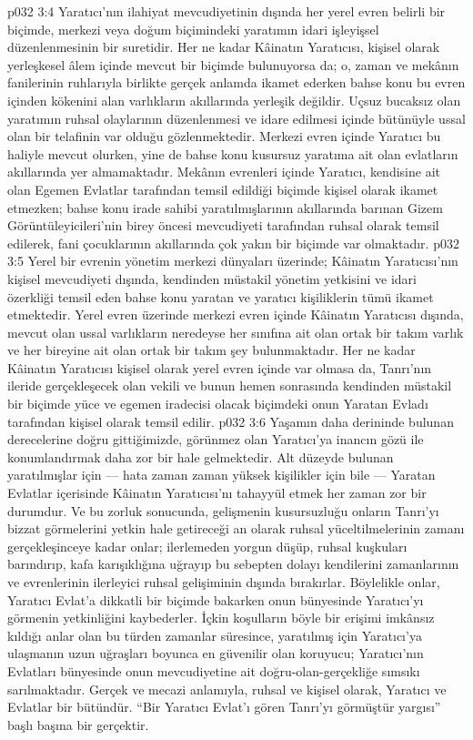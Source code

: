 \vs p032 3:4 Yaratıcı’nın ilahiyat mevcudiyetinin dışında her yerel evren belirli bir biçimde, merkezi veya doğum biçimindeki yaratımın idari işleyişsel düzenlenmesinin bir suretidir. Her ne kadar Kâinatın Yaratıcısı, kişisel olarak yerleşkesel âlem içinde mevcut bir biçimde bulunuyorsa da; o, zaman ve mekânın fanilerinin ruhlarıyla birlikte gerçek anlamda ikamet ederken bahse konu bu evren içinden kökenini alan varlıkların akıllarında yerleşik değildir. Uçsuz bucaksız olan yaratımın ruhsal olaylarının düzenlenmesi ve idare edilmesi içinde bütünüyle ussal olan bir telafinin var olduğu gözlenmektedir. Merkezi evren içinde Yaratıcı bu haliyle mevcut olurken, yine de bahse konu kusursuz yaratıma ait olan evlatların akıllarında yer almamaktadır. Mekânın evrenleri içinde Yaratıcı, kendisine ait olan Egemen Evlatlar tarafından temsil edildiği biçimde kişisel olarak ikamet etmezken; bahse konu irade sahibi yaratılmışlarının akıllarında barınan Gizem Görüntüleyicileri’nin birey öncesi mevcudiyeti tarafından ruhsal olarak temsil edilerek, fani çocuklarının akıllarında çok yakın bir biçimde var olmaktadır.
\vs p032 3:5 Yerel bir evrenin yönetim merkezi dünyaları üzerinde; Kâinatın Yaratıcısı’nın kişisel mevcudiyeti dışında, kendinden müstakil yönetim yetkisini ve idari özerkliği temsil eden bahse konu yaratan ve yaratıcı kişiliklerin tümü ikamet etmektedir. Yerel evren üzerinde merkezi evren içinde Kâinatın Yaratıcısı dışında, mevcut olan ussal varlıkların neredeyse her sınıfına ait olan ortak bir takım varlık ve her bireyine ait olan ortak bir takım şey bulunmaktadır. Her ne kadar Kâinatın Yaratıcısı kişisel olarak yerel evren içinde var olmasa da, Tanrı’nın ileride gerçekleşecek olan vekili ve bunun hemen sonrasında kendinden müstakil bir biçimde yüce ve egemen iradecisi olacak biçimdeki onun Yaratan Evladı tarafından kişisel olarak temsil edilir.
\vs p032 3:6 Yaşamın daha derininde bulunan derecelerine doğru gittiğimizde, görünmez olan Yaratıcı’ya inancın gözü ile konumlandırmak daha zor bir hale gelmektedir. Alt düzeyde bulunan yaratılmışlar için --- hata zaman zaman yüksek kişilikler için bile --- Yaratan Evlatlar içerisinde Kâinatın Yaratıcısı’nı tahayyül etmek her zaman zor bir durumdur. Ve bu zorluk sonucunda, gelişmenin kusursuzluğu onların Tanrı’yı bizzat görmelerini yetkin hale getireceği an olarak ruhsal yüceltilmelerinin zamanı gerçekleşinceye kadar onlar; ilerlemeden yorgun düşüp, ruhsal kuşkuları barındırıp, kafa karışıklığına uğrayıp bu sebepten dolayı kendilerini zamanlarının ve evrenlerinin ilerleyici ruhsal gelişiminin dışında bırakırlar. Böylelikle onlar, Yaratıcı Evlat’a dikkatli bir biçimde bakarken onun bünyesinde Yaratıcı’yı görmenin yetkinliğini kaybederler. İçkin koşulların böyle bir erişimi imkânsız kıldığı anlar olan bu türden zamanlar süresince, yaratılmış için Yaratıcı’ya ulaşmanın uzun uğraşları boyunca en güvenilir olan koruyucu; Yaratıcı’nın Evlatları bünyesinde onun mevcudiyetine ait doğru\hyp{}olan\hyp{}gerçekliğe sımsıkı sarılmaktadır. Gerçek ve mecazi anlamıyla, ruhsal ve kişisel olarak, Yaratıcı ve Evlatlar bir bütündür. “Bir Yaratıcı Evlat’ı gören Tanrı’yı görmüştür yargısı” başlı başına bir gerçektir.
